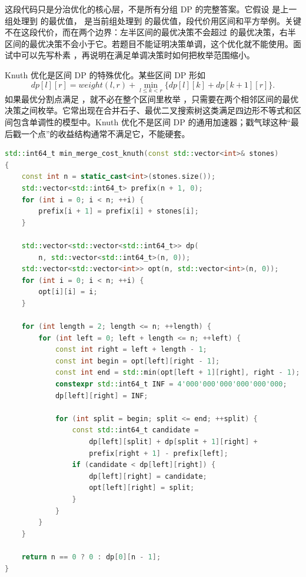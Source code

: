 这段代码只是分治优化的核心层，不是所有分组 DP 的完整答案。它假设  是上一组处理到  的最优值， 是当前组处理到  的最优值，段代价用区间和平方举例。关键不在这段代价，而在两个边界：左半区间的最优决策不会超过  的最优决策，右半区间的最优决策不会小于它。若题目不能证明决策单调，这个优化就不能使用。面试中可以先写朴素 ，再说明在满足单调决策时如何把枚举范围缩小。

Knuth 优化是区间 DP 的特殊优化。某些区间 DP 形如
\[
dp[l][r] = weight(l,r) + \min_{l \le k < r}\{dp[l][k] + dp[k+1][r]\}.
\]
如果最优分割点满足 ，就不必在整个区间里枚举 ，只需要在两个相邻区间的最优决策之间枚举。它常出现在合并石子、最优二叉搜索树这类满足四边形不等式和区间包含单调性的模型中。Knuth 优化不是区间 DP 的通用加速器；戳气球这种“最后戳一个点”的收益结构通常不满足它，不能硬套。

\begin{lstlisting}[language=C++,caption={Knuth 优化骨架：区间合并代价的决策窗口}]
std::int64_t min_merge_cost_knuth(const std::vector<int>& stones)
{
    const int n = static_cast<int>(stones.size());
    std::vector<std::int64_t> prefix(n + 1, 0);
    for (int i = 0; i < n; ++i) {
        prefix[i + 1] = prefix[i] + stones[i];
    }

    std::vector<std::vector<std::int64_t>> dp(
        n, std::vector<std::int64_t>(n, 0));
    std::vector<std::vector<int>> opt(n, std::vector<int>(n, 0));
    for (int i = 0; i < n; ++i) {
        opt[i][i] = i;
    }

    for (int length = 2; length <= n; ++length) {
        for (int left = 0; left + length <= n; ++left) {
            const int right = left + length - 1;
            const int begin = opt[left][right - 1];
            const int end = std::min(opt[left + 1][right], right - 1);
            constexpr std::int64_t INF = 4'000'000'000'000'000'000;
            dp[left][right] = INF;

            for (int split = begin; split <= end; ++split) {
                const std::int64_t candidate =
                    dp[left][split] + dp[split + 1][right] +
                    prefix[right + 1] - prefix[left];
                if (candidate < dp[left][right]) {
                    dp[left][right] = candidate;
                    opt[left][right] = split;
                }
            }
        }
    }

    return n == 0 ? 0 : dp[0][n - 1];
}
\end{lstlisting}

